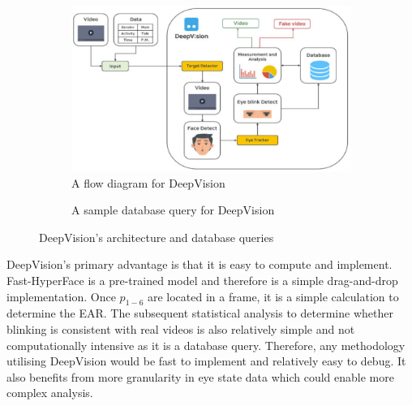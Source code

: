 \begin{figure}[H]
    \centering
    \begin{subfigure}{0.45\textwidth}
        \centering
        \includegraphics[width=\linewidth]{dissertation//figures/deepvision-flow.png}
        \caption{A flow diagram for DeepVision\cite{jung2020deepvision}}
        \label{fig:deepvision-flow}
    \end{subfigure}
    \hfill
    \begin{subfigure}{0.45\textwidth}
        \centering
        \caption{A sample database query for DeepVision\cite{jung2020deepvision}}
        \label{fig:deepvision-database}
    \end{subfigure}
    \caption{DeepVision's architecture and database queries}
    \label{fig:deepvision}
\end{figure}

DeepVision's primary advantage is that it is easy to compute and implement. Fast-HyperFace is a pre-trained model and therefore is a simple drag-and-drop implementation. Once $p_{1-6}$ are located in a frame, it is a simple calculation to determine the EAR. The subsequent statistical analysis to determine whether blinking is consistent with real videos is also relatively simple and not computationally intensive as it is a database query. Therefore, any methodology utilising DeepVision would be fast to implement and relatively easy to debug. It also benefits from more granularity in eye state data which could enable more complex analysis.

